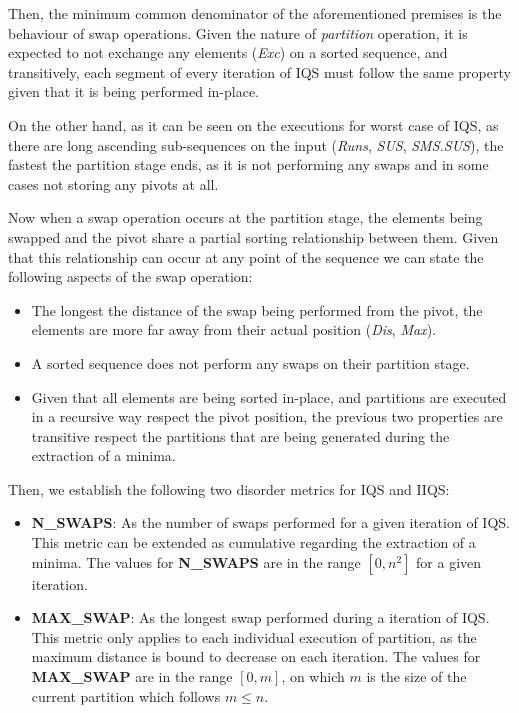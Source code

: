 Then, the minimum common denominator of the aforementioned premises is the behaviour of swap operations. Given the nature of \textit{partition} operation, it is expected to not exchange any elements (\textit{Exc}) on a sorted sequence, and transitively, each segment of every iteration of IQS must follow the same property given that it is being performed in-place.

On the other hand, as it can be seen on the executions for worst case of IQS, as there are long ascending sub-sequences on the input (\textit{Runs}, \textit{SUS}, \textit{SMS.SUS}), the fastest the partition stage ends, as it is not performing any swaps and in some cases not storing any pivots at all.

Now when a swap operation occurs at the partition stage, the elements being swapped and the pivot share a partial sorting relationship between them. Given that this relationship can occur at any point of the sequence we can state the following aspects of the swap operation:

\begin{itemize}
    \item The longest the distance of the swap being performed from the pivot, the elements are more far away from their actual position (\textit{Dis}, \textit{Max}).
    \item A sorted sequence does not perform any swaps on their partition stage.
    \item Given that all elements are being sorted in-place, and partitions are executed in a recursive way respect the pivot position, the previous two properties are transitive respect the partitions that are being generated during the extraction of a minima.
\end{itemize}

Then, we establish the following two disorder metrics for IQS and IIQS:

\begin{itemize}
    \item \textbf{N\_SWAPS}: As the number of swaps performed for a given iteration of IQS. This metric can be extended as cumulative regarding the extraction of a minima. The values for \textbf{N\_SWAPS} are in the range $[0, n^2]$ for a given iteration.
    \item \textbf{MAX\_SWAP}: As the longest swap performed during a iteration of IQS. This metric only applies to each individual execution of partition, as the maximum distance is bound to decrease on each iteration. The values for \textbf{MAX\_SWAP} are in the range $[0, m]$, on which $m$ is the size of the current partition which follows $m \leq n$.
\end{itemize}

